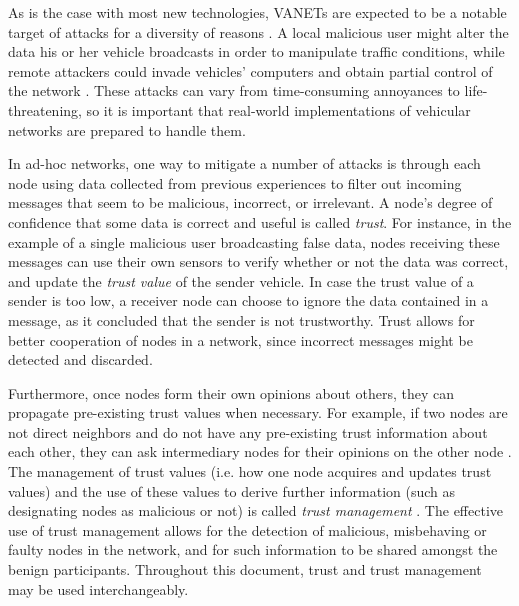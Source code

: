 As is the case with most new technologies, VANETs are expected to be a notable target of attacks for a diversity of reasons \cite{isaac2010security}.
A local malicious user might alter the data his or her vehicle broadcasts in order to manipulate traffic conditions, while remote attackers could invade vehicles' computers and obtain partial control of the network  \cite{garip2015congestion}.
These attacks can vary from time-consuming annoyances to life-threatening, so it is important that real-world implementations of vehicular networks are prepared to handle them.




In ad-hoc networks, one way to mitigate a number of attacks is through each node using data collected from previous experiences to filter out incoming messages that seem to be malicious, incorrect, or irrelevant.
A node's degree of confidence that some data is correct and useful is called \textit{trust}.
For instance, in the example of a single malicious user broadcasting false data, nodes receiving these messages can use their own sensors to verify whether or not the data was correct, and update the \textit{trust value} of the sender vehicle.
In case the trust value of a sender is too low, a receiver node can choose to ignore the data contained in a message, as it concluded that the sender is not trustworthy.
Trust allows for better cooperation of nodes in a network, since incorrect messages might be detected and discarded.

Furthermore, once nodes form their own opinions about others, they can propagate pre-existing trust values when necessary.
For example, if two nodes are not direct neighbors and do not have any pre-existing trust information about each other, they can ask intermediary nodes for their opinions on the other node \cite{wang2009trust}.
The management of trust values (i.e. how one node acquires and updates trust values) and the use of these values to derive further information (such as designating nodes as malicious or not) is called \textit{trust management} \cite{ma2011survey}. 
The effective use of trust management allows for the detection of malicious, misbehaving or faulty nodes in the network, and for such information to be shared amongst the benign participants. 
Throughout this document, trust and trust management may be used interchangeably.

